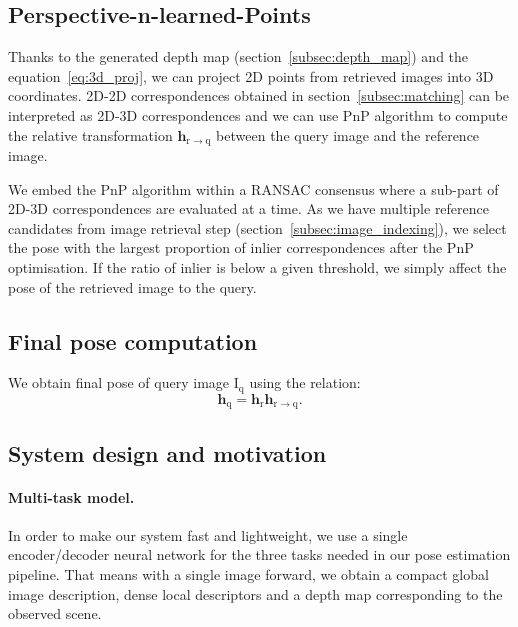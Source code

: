 \subsection{Perspective-n-learned-Points}

\label{subsec:pnlp}
Thanks to the generated depth map (section~\ref{subsec:depth_map}) and the equation~\ref{eq:3d_proj}, we can project 2D points from retrieved images into 3D coordinates. 2D-2D correspondences obtained in section~\ref{subsec:matching} can be interpreted as 2D-3D correspondences and we can use PnP algorithm to compute the relative transformation $\mathbf{h}_\mathrm{r \rightarrow q}$ between the query image and the reference image. 

We embed the PnP algorithm within a RANSAC consensus where a sub-part of 2D-3D correspondences are evaluated at a time. As we have multiple reference candidates from image retrieval step (section~\ref{subsec:image_indexing}), we select the pose with the largest proportion of inlier correspondences after the PnP optimisation. If the ratio of inlier is below a given threshold, we simply affect the pose of the retrieved image to the query.

\subsection{Final pose computation}
We obtain final pose of query image $\mathrm{I_q}$ using the relation:
\begin{equation}
	\mathbf{h}_\mathrm{q} = \mathbf{h}_\mathrm{r}\mathbf{h}_\mathrm{r \rightarrow q}.
\end{equation}

\subsection{System design and motivation}
\paragraph{Multi-task model.} In order to make our system fast and lightweight, we use a single encoder/decoder neural network for the three tasks needed in our pose estimation pipeline. That means with a single image forward, we obtain a compact global image description, dense local descriptors and a depth map corresponding to the observed scene.
